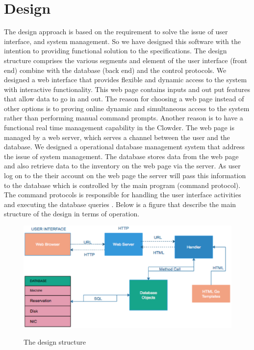 \section{Design}
The design approach is based on the requirement to solve the issue of user interface, and system management. So we have designed this software with the intention to providing functional solution to the specifications. The design structure comprises the various  segments and element of the user interface (front end) combine with the database (back end)  and the control protocols. 
We designed a web interface that provides  flexible and dynamic access to the system with interactive functionality. This web page contains inputs and out put features that allow data to go in and out. The reason for choosing a web page instead of other options is to proving online dynamic and simultaneous  access to the system rather than performing manual command prompts. Another reason is to have a functional real time management capability in the Clowder. The web page is managed by a web server, which serves a channel between the user and the database. We designed a operational database management system that address the issue of system management. The database stores data from the web page and also retrieve data to the inventory on the web page via the server. As user log on to the their account on the web page the server will pass this information to the  database which is controlled by the main program (command protocol). The command protocols is responsible for handling the user interface activities and executing the database queries .  Below is a figure that describe the main structure of the design in terms of operation.
\pagebreak
\begin{figure}
\includegraphics[width = \linewidth]{Design}
\label{fig:Design structure}
\caption{The design structure}
\end{figure}


